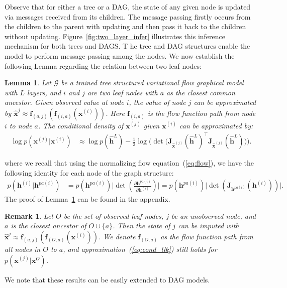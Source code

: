 \documentclass{article} %
\newtheorem{lemma}{Lemma}
\newtheorem{remark}{Remark}
\begin{document}
Observe that for either a tree or a DAG, the state of any given node is updated via messages received from its children. 
The message passing firstly occurs from the children to the parent with updating and then pass it back to the children without updating. 
Figure~\ref{fig:two_layer_infer} illustrates this inference mechanism for both trees and DAGS. T
he tree and DAG structures enable the model to perform message passing among the nodes.  
We now establish the following Lemma regarding the relation between two leaf nodes:
\begin{lemma}\label{lm:apprx}
Let $\mathcal{G}$ be a trained tree structured variational flow graphical model with $L$ layers, and $i$ and $j$ are two leaf nodes with $a$ as the closest common ancestor. Given observed value at node $i$, the value of node $j$ can be approximated by   $\widehat{\mathbf{x}}^{j} \approx  \mathbf{f}_{(a,j)}(\mathbf{f}_{(i, a)}(\mathbf{x}^{(i)}))$. Here $\mathbf{f}_{(i, a)}$ is the flow function path from node $i$ to node $a$. The conditional density of $\mathbf{x}^{(j)}$ given $\mathbf{x}^{(i)}$ can be approximated by: 
\begin{align} \label{eq:cond_llk}
\log p(\mathbf{x}^{(j)} | \mathbf{x}^{(i)}) &\approx  \log p(\widehat{\mathbf{h}}^L) -  \frac{1}{2} \log \big(\det \big(\mathbf{J}_{\widehat{\mathbf{x}}^{(j)}}(\widehat{\mathbf{h}}^L)^\top\mathbf{J}_{\widehat{\mathbf{x}}^{(j)}}(\widehat{\mathbf{h}}^L)\big) \big).
\end{align}
\end{lemma}
where we recall that using the normalizing flow equation~(\ref{eq:flow}), we have the following identity for each node of the graph structure:
\begin{align*}
p(\mathbf{h}^{(i)} | \mathbf{h}^{pa(i)}) & = p(\mathbf{h}^{pa(i)}) \big|\det(\frac{\partial \mathbf{h}^{pa(i)} }{\partial \mathbf{h}^{(i)}})\big| =
p(\mathbf{h}^{pa(i)}) \big|\det(\mathbf{J}_{\mathbf{h}^{pa(i)}}(\mathbf{h}^{(i)}))\big| .
\end{align*} 
The proof of Lemma~\ref{lm:apprx} can be found in the appendix. 

\begin{remark}\label{rmk:apprx_mul}
Let $O$ be the set of observed leaf nodes, $j$ be an unobserved node, and $a$ is the closest ancestor of $O \cup \{a\}$. Then the state of $j$ can be imputed with  $\widehat{\mathbf{x}}^{j} \approx  \mathbf{f}_{(a,j)}(\mathbf{f}_{(O, a)}(\mathbf{x}^{(i)}))$.  
We denote $\mathbf{f}_{(O, a)}$ as the flow function path from all nodes in $O$ to $a$, and approximation~(\ref{eq:cond_llk}) still holds for $p(\mathbf{x}^{(j)} | \mathbf{x}^{O})$.
\end{remark}
We note that these results can be easily extended to DAG models.
\end{document}
